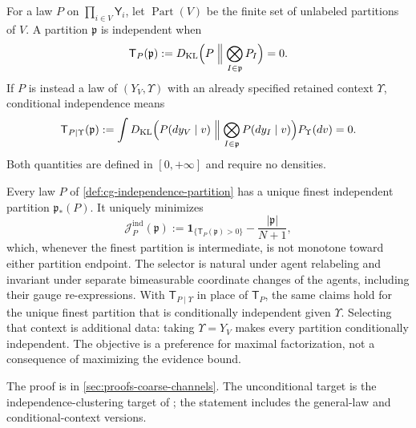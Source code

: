 For a law $P$ on $\prod_{i\in V}\mathsf Y_i$, let $\operatorname{Part}(V)$ be the finite
set of unlabeled partitions of $V$. A partition $\mathfrak p$ is independent when
\begin{equation}
\mathsf T_P(\mathfrak p):=D_{\mathrm{KL}}\Bigl(P\Bigm\Vert\bigotimes_{I\in\mathfrak p}P_I\Bigr)=0.
\label{eq:cg-independent-partition}
\end{equation}
If $P$ is instead a law of $(Y_V,\Upsilon)$ with an already specified retained context
$\Upsilon$, conditional independence means
\begin{equation}
\mathsf T_{P\mid\Upsilon}(\mathfrak p):=
\int D_{\mathrm{KL}}\Bigl(P(dy_V\mid v)\Bigm\Vert
\bigotimes_{I\in\mathfrak p}P(dy_I\mid v)\Bigr)P_\Upsilon(dv)=0.
\label{eq:cg-conditionally-independent-partition}
\end{equation}
Both quantities are defined in $[0,+\infty]$ and require no densities.

Every law $P$ of \cref{def:cg-independence-partition} has a unique finest independent
partition $\mathfrak p_*(P)$. It uniquely minimizes
\begin{equation}
\mathscr J^{\mathrm{ind}}_P(\mathfrak p)
:=\mathbf1_{\{\mathsf T_P(\mathfrak p)>0\}}-
\frac{|\mathfrak p|}{N+1},
\label{eq:cg-independent-selector-objective}
\end{equation}
which, whenever the finest partition is intermediate, is not monotone toward either
partition endpoint. The selector is natural under agent relabeling and invariant under
separate bimeasurable coordinate changes of the agents, including their gauge
re-expressions. With $\mathsf T_{P\mid\Upsilon}$ in place of $\mathsf T_P$, the same
claims hold for the unique finest partition that is conditionally independent given
$\Upsilon$. Selecting that context is additional data: taking $\Upsilon=Y_V$ makes
every partition conditionally independent. The objective is a preference for maximal
factorization, not a consequence of maximizing the evidence bound.

The proof is in \cref{sec:proofs-coarse-channels}. The unconditional target is the
independence-clustering target of \citet[Def.~1]{Ryabko2017IndependenceClustering}; the
statement includes the general-law and conditional-context versions.

